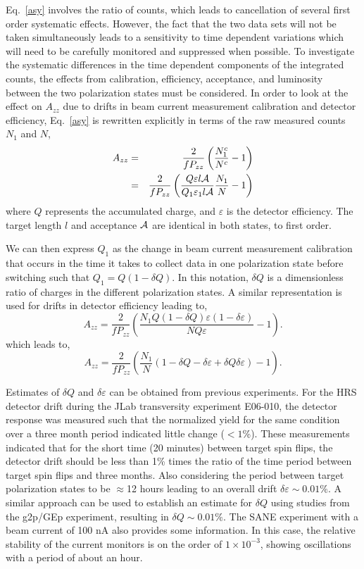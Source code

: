 Eq.~\ref{asy} involves the ratio of counts, which leads to cancellation of several first order systematic effects.  However, the fact that the two data sets will not be taken simultaneously leads to a sensitivity to time dependent variations which will need to be carefully monitored and suppressed when possible.  
%
To investigate the systematic differences in the time dependent components of the
integrated counts, the effects from calibration, efficiency, acceptance,
and luminosity between the two polarization states must be considered.
In order to look at the effect on $A_{zz}$ due to drifts in beam current measurement
calibration and detector efficiency, Eq.~\ref{asy} is rewritten explicitly in terms of the raw measured counts $N_1$ and $N$,
\begin{eqnarray} \label{3c}
\nonumber
A_{zz}&=&\frac{2}{fP_{zz}}\left(\frac{N^c_1}{N^c}-1\right) \\
      &=&\frac{2}{fP_{zz}}\left(\frac{Q\varepsilon l \cal{A}}{Q_1\varepsilon_1 l \cal{A}}\frac{N_1}{N}-1\right)
\end{eqnarray}
where $Q$ represents the accumulated charge, and $\varepsilon$ is the detector efficiency. The target length $l$  and acceptance $\cal{A}$ are identical in both states, to first order.

We can then express $Q_1$ as the change in beam current measurement calibration that occurs in
the time it takes to collect data in one polarization state before switching such that $Q_1=Q(1-\delta{Q})$.
In this notation, $\delta{Q}$ is a dimensionless ratio of charges in the different polarization states.  A similar representation
is used for drifts in detector efficiency leading to,
\begin{equation}
A_{zz}=\frac{2}{fP_{zz}}\left(\frac{N_1Q(1-\delta{Q})\varepsilon(1-\delta\varepsilon)}{NQ\varepsilon}-1\right).
\end{equation}
which leads to,
\begin{equation}
A_{zz}=\frac{2}{fP_{zz}}\left(\frac{N_1}{N}(1-\delta{Q}-\delta\varepsilon+\delta{Q}\delta\varepsilon)-1\right).
\end{equation}

Estimates of $\delta{Q}$ and $\delta\varepsilon$ can be obtained from previous experiments.
For the HRS detector drift during the JLab transversity experiment E06-010, the detector response
was measured such that the normalized yield for the same condition over a three month period indicated little change ($<1$\%).
These measurements indicated that for the short time (20 minutes) between target spin flips,
the detector drift should be less than 1\% times the ratio of the time period between target spin flips and three months.
Also considering the period between target polarization states to be
$\approx$12 hours leading to an overall drift $\delta\varepsilon\sim0.01\%$.  A similar approach can be used to establish an estimate
for $\delta{Q}$ using studies from the g2p/GEp experiment, resulting in $\delta{Q}\sim0.01\%$.  The SANE
experiment with a beam current of 100 nA also provides some information. In this case, the relative stability of the current
monitors is on the order of $1\times10^{-3}$, showing oscillations with a period of about an hour.

